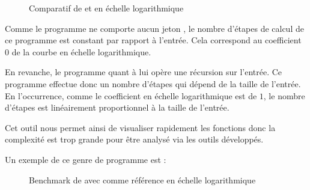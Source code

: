 \documentclass[a4paper, 11pt]{article}
\begin{document}
\begin{figure}[H]
        \begin{center}
            \caption{Comparatif de \protect{} et \protect{} en échelle logarithmique}
        \end{center}
\end{figure}

Comme le programme  ne comporte aucun jeton , le nombre d'étapes de calcul 
de ce programme est constant par rapport à l'entrée. Cela correspond au coefficient $0$ de la courbe
en échelle logarithmique.

En revanche, le programme  quant à lui opère une récursion sur l'entrée. Ce programme effectue donc un nombre d'étapes qui
dépend de la taille de l'entrée. En l'occurrence, comme le coefficient en échelle logarithmique est de $1$, le nombre d'étapes est linéairement
proportionnel à la taille de l'entrée.

Cet outil nous permet ainsi de visualiser rapidement les fonctions donc la complexité est trop grande
pour être analysé via les outils développés.

Un exemple de ce genre de programme est :

\begin{figure}[H]
        \begin{center}
            \caption{Benchmark de \protect{} avec \protect{} comme référence en échelle logarithmique}
        \end{center}
\end{figure}
\end{document}
